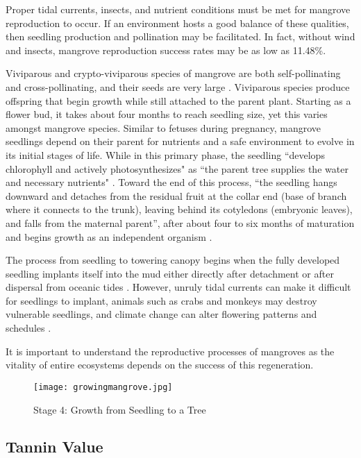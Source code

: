 Proper tidal currents, insects, and nutrient conditions must be met for mangrove reproduction to occur. If an environment hosts a good balance of these qualities, then seedling production and pollination may be facilitated.  In fact, without wind and insects, mangrove reproduction success rates may be as low as 11.48\%. 

Viviparous and crypto-viviparous species of mangrove are both self-pollinating and cross-pollinating, and their seeds are very large \cite{ge1999reproductive}. Viviparous species produce offspring that begin growth while still attached to the parent plant. Starting as a flower bud, it takes about four months to reach seedling size, yet this varies amongst mangrove species. Similar to fetuses during pregnancy, mangrove seedlings depend on their parent for nutrients and a safe environment to evolve in its initial stages of life. While in this primary phase, the seedling ``develops chlorophyll and actively photosynthesizes" as ``the parent tree supplies the water and necessary nutrients" \citep{selvam2004ecology}. Toward the end of this process, ``the seedling hangs downward and detaches from the residual fruit at the collar end (base of branch where it connects to the trunk), leaving behind its cotyledons (embryonic leaves), and falls from the maternal parent'', after about four to six months of maturation and begins growth as an independent organism . 

The process from seedling to towering canopy begins when the fully developed seedling implants itself into the mud either directly after detachment or after dispersal from oceanic tides \citep{aluri2013reproductive}. However, unruly tidal currents can make it difficult for seedlings to implant, animals such as crabs and monkeys may destroy vulnerable seedlings, and climate change can alter flowering patterns and schedules \citep{aluri2013reproductive}.

It is important to understand the reproductive processes of mangroves as the vitality of entire ecosystems depends on the success of this regeneration. 
	
\begin{figure}[!htb]
      \centering
        \texttt{[image: growingmangrove.jpg]}
        \caption {Stage 4: Growth from Seedling to a Tree}
        \label{fig:Mangrove_Stage4}
\end{figure}
      
\subsection{Tannin Value}

